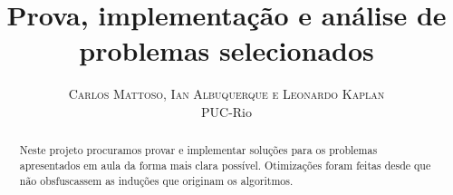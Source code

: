 \documentclass[twoside]{article}
\title{\vspace{-15mm}\fontsize{24pt}{10pt}\selectfont\textbf{Prova, implementação e análise de problemas selecionados}} %
\author{
\large
\textsc{Carlos Mattoso, Ian Albuquerque e Leonardo Kaplan
}\\[2mm] %
\normalsize PUC-Rio \\ %
}
\date{}
\begin{document}
\maketitle %

\thispagestyle{fancy} %


\begin{abstract}

\noindent 
Neste projeto procuramos provar e implementar soluções para os problemas apresentados em aula da forma mais clara possível.
Otimizações foram feitas desde que não obsfuscassem as induções que originam os algoritmos.
\end{abstract}

\end{document}
